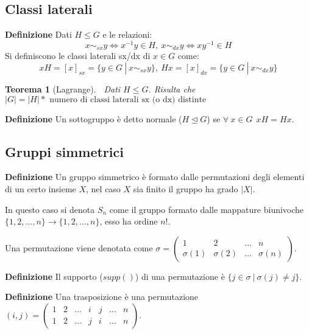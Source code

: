\documentclass{article}
\newtheorem{theorem}{Teorema}
\begin{document}
\newpage

\subsection{Classi laterali}

\textbf{Definizione} Dati $H\leqslant G$ e le relazioni:
$$x\sim_{sx}y\iff x^{-1}y\in H,\ x\sim_{dx}y\iff xy^{-1}\in H$$
Si definiscono le classi laterali sx/dx di $x\in G$ come:
$$xH=[x]_{sx}=\{y\in G\ |\ x\sim_{sx}y\},\ Hx=[x]_{dx}=\{y\in G\ |\ x\sim_{dx}y\}$$\newline

\begin{theorem}[Lagrange]$\ $\newline
    Dati $H\leqslant G$. Risulta che $|G|=|H|*\text{ numero di classi laterali sx (o dx) distinte}$\newline
\end{theorem}

\noindent\textbf{Definizione} Un sottogruppo è detto normale ($H\trianglelefteq G$) se $\forall\ x\in G\ \ xH=Hx$.

\subsection{Gruppi simmetrici}

\textbf{Definizione} Un gruppo simmetrico è formato dalle permutazioni degli elementi di un certo insieme $X$, nel caso $X$ sia finito il gruppo ha grado $|X|$.\newline

\noindent In questo caso si denota $S_n$ come il gruppo formato dalle mappature biunivoche $\{1,2,\ldots,n\}\rightarrow\{1,2,\ldots,n\}$, esso ha ordine $n!$.\newline

\noindent Una permutazione viene denotata come 
$\sigma=
\begin{pmatrix}
    1 & 2 & \ldots & n\\
    \sigma(1) & \sigma(2) & \ldots & \sigma(n)
\end{pmatrix}$.\newline\newline

\noindent\textbf{Definizione} Il supporto ($supp()$) di una permutazione è $\{j\in\sigma\ |\ \sigma(j)\neq j\}$.\newline\newline

\noindent\textbf{Definizione} Una trasposizione è una permutazione 
$(i,j)=
\begin{pmatrix}
    1 & 2 & \ldots & i & j & \ldots & n\\
    1 & 2 & \ldots & j & i & \ldots & n
\end{pmatrix}$.\newline\newline
\end{document}
